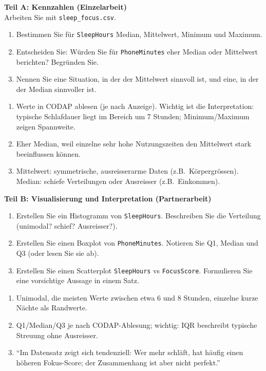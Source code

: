 \begin{myexercise}\label{myexercise:aufgabenpaket-1}
	\textbf{Teil A: Kennzahlen (Einzelarbeit)} \\
	Arbeiten Sie mit \texttt{sleep\_focus.csv}.
	\begin{enumerate}
		\item Bestimmen Sie für \texttt{SleepHours} Median, Mittelwert, Minimum und Maximum.
		\item Entscheiden Sie: Würden Sie für \texttt{PhoneMinutes} eher Median oder Mittelwert berichten? Begründen Sie.
		\item Nennen Sie eine Situation, in der der Mittelwert sinnvoll ist, und eine, in der der Median sinnvoller ist.
	\end{enumerate}
	\begin{myanswer}
		\begin{enumerate}
			\item Werte in \gls{CODAP} ablesen (je nach Anzeige). Wichtig ist die Interpretation: typische Schlafdauer liegt im Bereich um 7 Stunden; Minimum/Maximum zeigen Spannweite.
			\item Eher Median, weil einzelne sehr hohe Nutzungszeiten den Mittelwert stark beeinflussen können.
			\item Mittelwert: symmetrische, ausreisserarme Daten (z.B.\ Körpergrössen). Median: schiefe Verteilungen oder Ausreisser (z.B.\ Einkommen).
		\end{enumerate}
	\end{myanswer}
\end{myexercise}

\begin{myexercise}\label{myexercise:aufgabenpaket-2}
	\textbf{Teil B: Visualisierung und Interpretation (Partnerarbeit)}
	\begin{enumerate}
		\item Erstellen Sie ein Histogramm von \texttt{SleepHours}. Beschreiben Sie die Verteilung (unimodal? schief? Ausreisser?).
		\item Erstellen Sie einen Boxplot von \texttt{PhoneMinutes}. Notieren Sie Q1, Median und Q3 (oder lesen Sie sie ab).
		\item Erstellen Sie einen Scatterplot \texttt{SleepHours} vs \texttt{FocusScore}. Formulieren Sie eine vorsichtige Aussage in einem Satz.
	\end{enumerate}
	\begin{myanswer}
		\begin{enumerate}
			\item Unimodal, die meisten Werte zwischen etwa 6 und 8 Stunden, einzelne kurze Nächte als Randwerte.
			\item Q1/Median/Q3 je nach \gls{CODAP}-Ablesung; wichtig: \gls{IQR} beschreibt typische Streuung ohne Ausreisser.
			\item ``Im Datensatz zeigt sich tendenziell: Wer mehr schläft, hat häufig einen höheren Fokus-Score; der Zusammenhang ist aber nicht perfekt.''
		\end{enumerate}
	\end{myanswer}
\end{myexercise}


